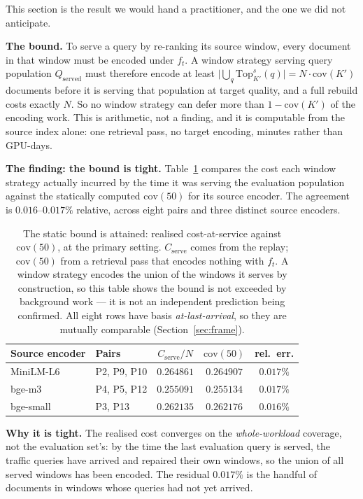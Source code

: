 \documentclass[conference]{IEEEtran}
\newcommand{\topk}{\mathrm{Top}}
\newcommand{\cov}{\mathrm{cov}}
\begin{document}
This section is the result we would hand a practitioner, and the one we did not
anticipate.

\textbf{The bound.} To serve a query by re-ranking its source window, every document in
that window must be encoded under $f_t$. A window strategy serving query population
$Q_{\text{served}}$ must therefore encode at least $\bigl\lvert\bigcup_q
\topk_{K'}^{s}(q)\bigr\rvert = N\cdot\cov(K')$ documents before it is serving that
population at target quality, and a full rebuild costs exactly $N$. So no window strategy
can defer more than $1 - \cov(K')$ of the encoding work. This is arithmetic, not a
finding, and it is computable from the source index alone: one retrieval pass, no target
encoding, minutes rather than GPU-days.

\textbf{The finding: the bound is tight.} Table~\ref{tab:econ} compares the cost each
window strategy actually incurred by the time it was serving the evaluation population
against the statically computed $\cov(50)$ for its source encoder. The agreement is
$0.016$--$0.017\%$ relative, across eight pairs and three distinct source encoders.

\begin{table}[t]
\centering
\caption{The static bound is attained: realised cost-at-service against $\cov(50)$, at the
primary setting. $C_{\text{serve}}$ comes from the replay; $\cov(50)$ from a retrieval pass
that encodes nothing with $f_t$. A window strategy encodes the union of the windows it serves
by construction, so this table shows the bound is not exceeded by background work --- it is
not an independent prediction being confirmed. All eight rows have basis \emph{at-last-arrival}, so they are
mutually comparable (Section~\ref{sec:frame}).}
\label{tab:econ}
\small
\begin{tabular}{@{}llccc@{}}
\toprule
Source encoder & Pairs & $C_{\text{serve}}/N$ & $\cov(50)$ & rel.\ err. \\
\midrule
MiniLM-L6 & P2, P9, P10 & $0.264861$ & $0.264907$ & $0.017\%$ \\
bge-m3    & P4, P5, P12 & $0.255091$ & $0.255134$ & $0.017\%$ \\
bge-small & P3, P13     & $0.262135$ & $0.262176$ & $0.016\%$ \\
\bottomrule
\end{tabular}
\end{table}

\textbf{Why it is tight.} The realised cost converges on the \emph{whole-workload}
coverage, not the evaluation set's: by the time the last evaluation query is served, the
traffic queries have arrived and repaired their own windows, so the union of all served
windows has been encoded. The residual $0.017\%$ is the handful of documents in windows
whose queries had not yet arrived.
\end{document}

